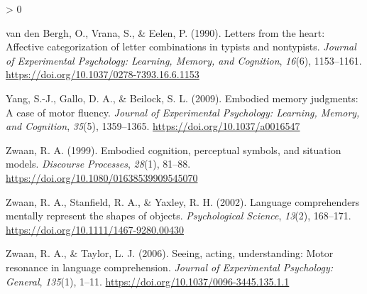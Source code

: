 \documentclass[
  english,
  man,mask]{apa7}
\newlength{\cslhangindent}
\newenvironment{CSLReferences}[2] %
 {%
  \setlength{\parindent}{0pt}
  \ifodd #1 \everypar{\setlength{\hangindent}{\cslhangindent}}\ignorespaces\fi
  \ifnum #2 > 0
  \setlength{\parskip}{#2\baselineskip}
  \fi
 }%
 {}
\begin{document}
\begin{CSLReferences}{1}{0}
\leavevmode\hypertarget{ref-VandenBergh1990}{}%
van den Bergh, O., Vrana, S., \& Eelen, P. (1990). {Letters from the heart: Affective categorization of letter combinations in typists and nontypists.} \emph{Journal of Experimental Psychology: Learning, Memory, and Cognition}, \emph{16}(6), 1153--1161. \url{https://doi.org/10.1037/0278-7393.16.6.1153}

\leavevmode\hypertarget{ref-Yang2009}{}%
Yang, S.-J., Gallo, D. A., \& Beilock, S. L. (2009). {Embodied memory judgments: A case of motor fluency.} \emph{Journal of Experimental Psychology: Learning, Memory, and Cognition}, \emph{35}(5), 1359--1365. \url{https://doi.org/10.1037/a0016547}

\leavevmode\hypertarget{ref-Zwaan1999}{}%
Zwaan, R. A. (1999). {Embodied cognition, perceptual symbols, and situation models}. \emph{Discourse Processes}, \emph{28}(1), 81--88. \url{https://doi.org/10.1080/01638539909545070}

\leavevmode\hypertarget{ref-Zwaan2002}{}%
Zwaan, R. A., Stanfield, R. A., \& Yaxley, R. H. (2002). {Language comprehenders mentally represent the shapes of objects}. \emph{Psychological Science}, \emph{13}(2), 168--171. \url{https://doi.org/10.1111/1467-9280.00430}

\leavevmode\hypertarget{ref-Zwaan2006}{}%
Zwaan, R. A., \& Taylor, L. J. (2006). {Seeing, acting, understanding: Motor resonance in language comprehension.} \emph{Journal of Experimental Psychology: General}, \emph{135}(1), 1--11. \url{https://doi.org/10.1037/0096-3445.135.1.1}

\end{CSLReferences}
\end{document}
